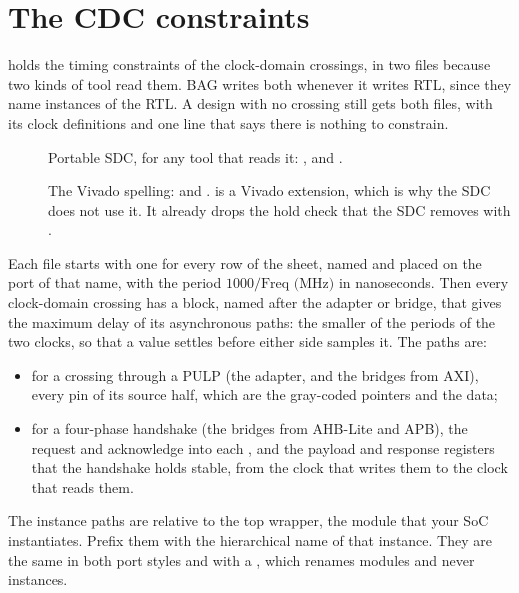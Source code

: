\section{The CDC constraints}
\label{sec:constraints}

 holds the timing constraints of the clock-domain crossings, in two
files because two kinds of tool read them. BAG writes both whenever it writes RTL, since
they name instances of the RTL. A design with no crossing still gets both files, with its
clock definitions and one line that says there is nothing to constrain.

\begin{description}
\item[] Portable SDC, for any tool that reads it:
  ,  and .
\item[] The Vivado spelling:  and
  .  is a Vivado extension, which is
  why the SDC does not use it. It already drops the hold check that the SDC removes with
  .
\end{description}

Each file starts with one  for every row of the  sheet,
named and placed on the port of that name, with the period $1000 / \textrm{Freq (MHz)}$ in
nanoseconds. Then every clock-domain crossing has a block, named after the adapter or bridge,
that gives the maximum delay of its asynchronous paths: the smaller of the periods of the
two clocks, so that a value settles before either side samples it. The paths are:

\begin{itemize}
\item for a crossing through a PULP  (the  adapter, and the bridges
  from AXI), every  pin of its source half, which are the
  gray-coded pointers and the data;
\item for a four-phase handshake (the bridges from AHB-Lite and APB), the request and
  acknowledge into each , and the payload and response registers that the
  handshake holds stable, from the clock that writes them to the clock that reads them.
\end{itemize}

The instance paths are relative to the top wrapper, the module that your SoC instantiates.
Prefix them with the hierarchical name of that instance. They are the same in both port
styles and with a , which renames modules and never instances.

